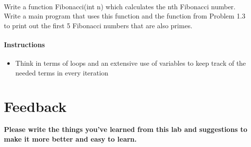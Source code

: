 \documentclass[11pt,fleqn]{book} %
\begin{document}
~\\
\begin{problem}
	Write a function Fibonacci(int n) which calculates the nth Fibonacci number. Write a main program that uses this function and the function from Problem 1.3 to print out the first 5 Fibonacci numbers that are also primes.
	\paragraph{Instructions}
	\begin{itemize}
		\item Think in terms of loops and an extensive use of variables to keep track of the needed terms in every iteration
	\end{itemize}
\end{problem}
\newpage
\section{Feedback}
\textbf{Please write the things you've learned from this lab and suggestions to make it more better and easy to learn.}



\end{document}
